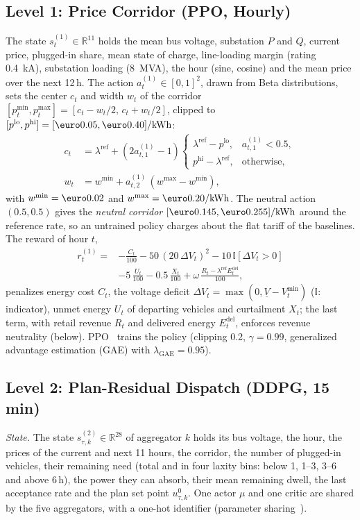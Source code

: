 \documentclass[journal]{IEEEtran}
\newcommand{\vlim}{\underline{V}}
\begin{document}
\subsection{Level 1: Price Corridor (PPO, Hourly)}
The state $s^{(1)}_t\in\mathbb{R}^{11}$ holds the mean bus voltage, substation
$P$ and $Q$, current price, plugged-in share, mean state of charge,
line-loading margin (rating \SI{0.4}{kA}), substation loading (\SI{8}{MVA}),
the hour (sine, cosine) and the mean price over the next 12\,h. The action $a^{(1)}_t\in[0,1]^2$, drawn from Beta
distributions, sets the center $c_t$ and width $w_t$ of the corridor
$[p^{\min}_t,p^{\max}_t]=[c_t-w_t/2,\,c_t+w_t/2]$, clipped to
$[p^{\mathrm{lo}},p^{\mathrm{hi}}]=[\text{\euro}0.05,\text{\euro}0.40]/\mathrm{kWh}$:
\begin{align}
c_t&=\lambda^{\mathrm{ref}}+(2a^{(1)}_{t,1}-1)\begin{cases}\lambda^{\mathrm{ref}}-p^{\mathrm{lo}}, & a^{(1)}_{t,1}<0.5,\\ p^{\mathrm{hi}}-\lambda^{\mathrm{ref}}, & \text{otherwise,}\end{cases}\nonumber\\
w_t&=w^{\min}+a^{(1)}_{t,2}\,(w^{\max}-w^{\min}),
\end{align}
with $w^{\min}=\text{\euro}0.02$ and $w^{\max}=\text{\euro}0.20/\mathrm{kWh}$.
The neutral action $(0.5,0.5)$ gives the \emph{neutral corridor}
$[\text{\euro}\GNeutralLo,\text{\euro}\GNeutralHi]/\mathrm{kWh}$ around the
reference rate, so an untrained policy charges about the flat tariff of the
baselines. The reward of hour $t$,
\begin{align}
r^{(1)}_t={}&-\frac{C_t}{100}-50\,(20\,\Delta V_t)^2-10\,\mathbb{I}[\Delta V_t>0]\nonumber\\
&-5\,\frac{U_t}{100}-0.5\,\frac{X_t}{100}+\omega\,\frac{R_t-\lambda^{\mathrm{ref}}E^{\mathrm{del}}_t}{100},
\label{eq:r1}
\end{align}
penalizes energy cost $C_t$, the voltage deficit
$\Delta V_t=\max(0,\vlim-V^{\min}_t)$ ($\mathbb{I}$: indicator), unmet energy
$U_t$ of departing vehicles and curtailment $X_t$; the last term, with retail
revenue $R_t$ and delivered energy $E^{\mathrm{del}}_t$, enforces revenue
neutrality (below). PPO~\cite{schulman2017} trains the policy (clipping 0.2,
$\gamma=0.99$, generalized advantage estimation (GAE) with
$\lambda_{\mathrm{GAE}}=0.95$).

\subsection{Level 2: Plan-Residual Dispatch (DDPG, 15 min)}
\emph{State.} The state $s^{(2)}_{\tau,k}\in\mathbb{R}^{28}$ of aggregator $k$
holds its bus voltage, the hour, the prices of the current and next 11 hours,
the corridor, the number of plugged-in vehicles, their remaining need (total
and in four laxity bins: below 1, 1--3, 3--6 and above 6\,h), the power they
can absorb, their mean remaining dwell, the last acceptance rate and the plan
set point $u^0_{\tau,k}$. One actor $\mu$ and one critic are shared by the
five aggregators, with a one-hot identifier (parameter sharing~\cite{gupta2017}).
\end{document}
